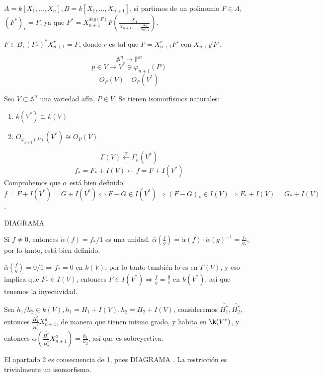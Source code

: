 \begin{nota}
$A=k[X_1,\dots ,X_n], B=k[X_1,\dots , X_{n+1}]$, si partimos de un polinomio $F\in A$, $(F^*)_*=F$, ya que $F^*=X^{deg(F)}_{n+1}F(\frac{X_1}{X_{n+1},\dots , \frac{X_n}{X_{n+1}}})$.

$F\in B, (F_*)^*X^r_{n+1}=F$, donde $r$ es tal que $F=X^r_{n+1}F'$ con $X_{n+1}\not | F'$. 
\end{nota}

\begin{nota}
  $$\mathbb{A}^n \rightarrow \mathbb{P}^n$$
  $$p\in V \rightarrow V^* \ni \varphi_{n+1}(P)$$
  $$O_P(V) \quad O_P(V^*)$$
\end{nota}

\begin{Teo}
  Sea $V\subset \mathbb{A}^n$ una variedad afín, $P\in V$. Se tienen isomorfismos naturales:
  \begin{enumerate}
  \item $k(V^*)\cong k(V)$
  \item $O_{\varphi_{n+1}(P)}(V^*)\cong O_P(V)$
  \end{enumerate}
\end{Teo}

\begin{Dem}
  $$\Gamma(V) \xleftarrow{\alpha} \Gamma_h(V^*)$$
  $$f_*=F_*+I(V) \leftarrow f = F+I(V^*)$$
  Comprobemos que $\alpha$ está bien definido. $f=F+I(V^*)=G+I(V^*)\Leftrightarrow F-G\in I(V^*) \Rightarrow (F-G)_*\in I(V) \Rightarrow F_*+I(V)=G_*+I(V)$.


  DIAGRAMA
  
  Si $f\neq 0$, entonces $\tilde{\alpha}(f)=f_*/1$ es una unidad. $\bar{\alpha}(\frac{f}{g})=\tilde{\alpha}(f)\cdot \tilde{\alpha}(g)^{-1}=\frac{f_*}{g_*}$, por lo tanto, está bien definido.

  
  \vspace{2mm}

  $\bar{\alpha}(\frac{f}{g})=0/1 \Rightarrow f_* = 0$ en $k(V)$, por lo tanto también lo es en $\Gamma(V)$, y eso implica que  $F_*\in I(V)$, entonces $F\in I(V^*) \Rightarrow \frac{f}{g}=\frac{0}{1}$ en $k(V^*)$, así que tenemos la inyectividad.

  
  \vspace{2mm}

  
  Sea $h_1/h_2\in k(V), h_1=H_1+I(V), h_2=H_2+I(V)$, consideremos $\bar{H_1^*}, \bar{H_2^*}$, entonces $\frac{\bar{H_1^*}}{\bar{H_2^*}}X_{n+1}^a$, de manera que tienen mismo grado, y habita en $\k(V^*)$, y entonces $\alpha(\frac{\bar{H_1^*}}{\bar{H_2^*}}X_{n+1}^a)=\frac{h_1}{h_2}$, así que es sobreyectiva.

  El apartado 2 es consecuencia de 1, pues DIAGRAMA . La restricción es trivialmente un isomorfismo. 
  
  
\end{Dem}

